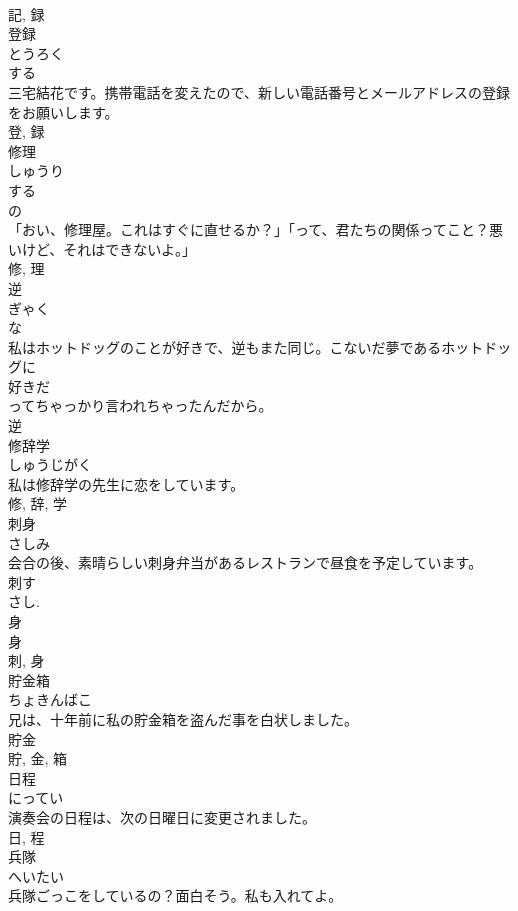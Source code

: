\documentclass[8pt]{extreport}
\begin{document}
\begin{CJK}{UTF8}{min}
\\	記, 録	
\\	登録	
\\	とうろく	
\\	する 
\\	三宅結花です。携帯電話を変えたので、新しい電話番号とメールアドレスの登録をお願いします。	
\\	登, 録	
\\	修理	
\\	しゅうり	
\\	する 
\\	の 
\\	「おい、修理屋。これはすぐに直せるか？」「って、君たちの関係ってこと？悪いけど、それはできないよ。」	
\\	修, 理	
\\	逆	
\\	ぎゃく	
\\	な 
\\	私はホットドッグのことが好きで、逆もまた同じ。こないだ夢であるホットドッグに
\\	好きだ
\\	ってちゃっかり言われちゃったんだから。	
\\	逆	
\\	修辞学	
\\	しゅうじがく	
\\	私は修辞学の先生に恋をしています。	
\\	修, 辞, 学	
\\	刺身	
\\	さしみ	
\\	会合の後、素晴らしい刺身弁当があるレストランで昼食を予定しています。	
\\	刺す 
\\	さし. 
\\	身 
\\	身
\\	刺, 身	
\\	貯金箱	
\\	ちょきんばこ	
\\	兄は、十年前に私の貯金箱を盗んだ事を白状しました。	
\\	貯金 
\\	貯, 金, 箱	
\\	日程	
\\	にってい	
\\	演奏会の日程は、次の日曜日に変更されました。	
\\	日, 程	
\\	兵隊	
\\	へいたい	
\\	兵隊ごっこをしているの？面白そう。私も入れてよ。	

\end{CJK}
\end{document}
